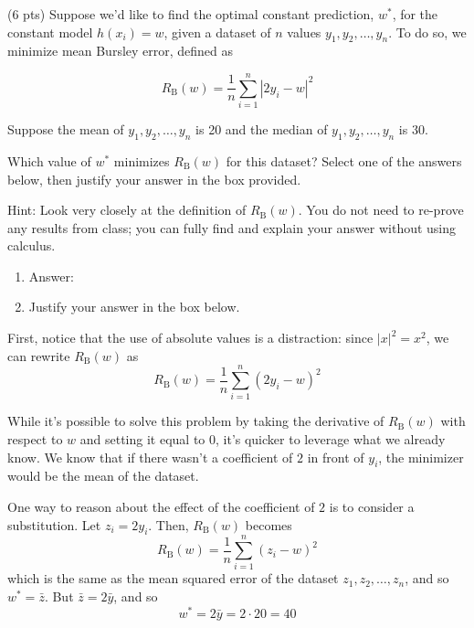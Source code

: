 \documentclass[11pt]{article}
\begin{document}
\begin{prob}
\begin{subprob}(6 pts) Suppose we'd like to find the optimal constant prediction, $w^*$, for the constant model $h(x_i) = w$, given a dataset of $n$ values $y_1, y_2, \ldots, y_n$. To do so, we minimize mean Bursley error, defined as

$$R_{\text{B}}(w) = \frac{1}{n} \sum_{i=1}^n | 2y_i - w |^2$$

Suppose the mean of $y_1, y_2, \ldots, y_n$ is 20 and the median of $y_1, y_2, \ldots, y_n$ is 30.

Which value of $w^*$ minimizes $R_{\text{B}}(w)$ for this dataset? Select one of the answers below, then justify your answer in the box provided.

Hint: Look very closely at the definition of $R_{\text{B}}(w)$. You do not need to re-prove any results from class; you can fully find and explain your answer without using calculus.

\begin{enumerate}
    \item Answer: \:      
    \item Justify your answer in the box below. \\  \emptybox{6cm}{}
\end{enumerate}

\begin{solution}
First, notice that the use of absolute values is a distraction: since $|x|^2 = x^2$, we can rewrite $R_{\text{B}}(w)$ as
$$R_{\text{B}}(w) = \frac{1}{n} \sum_{i=1}^n (2y_i - w)^2$$

While it's possible to solve this problem by taking the derivative of $R_{\text{B}}(w)$ with respect to $w$ and setting it equal to 0, it's quicker to leverage what we already know. We know that if there wasn't a coefficient of $2$ in front of $y_i$, the minimizer would be the mean of the dataset.

One way to reason about the effect of the coefficient of $2$ is to consider a substitution. Let $z_i = 2y_i$. Then, $R_{\text{B}}(w)$ becomes
$$R_{\text{B}}(w) = \frac{1}{n} \sum_{i=1}^n (z_i - w)^2$$
which is the same as the mean squared error of the dataset $z_1, z_2, \ldots, z_n$, and so $w^* = \bar{z}$. But $\bar{z} = 2 \bar{y}$, and so $$w^* = 2 \bar{y} = 2 \cdot 20 = \boxed{40}$$


\end{solution}
\end{subprob}
\end{prob}
\end{document}
